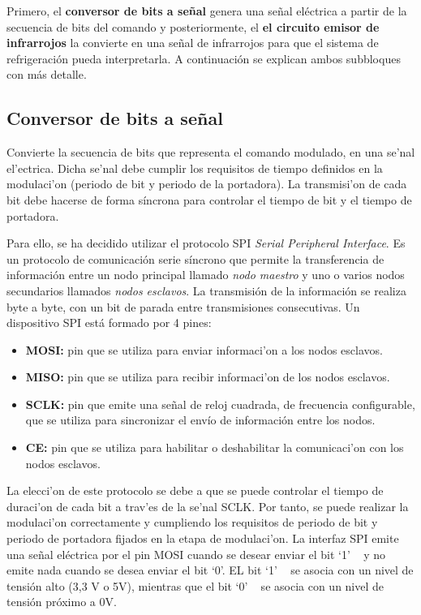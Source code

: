 {	Primero, el \textbf{conversor de bits a señal} genera una señal eléctrica a partir de la secuencia de bits del comando y posteriormente, el \textbf{el circuito emisor de infrarrojos} la convierte en una señal de infrarrojos para que el sistema de refrigeración pueda interpretarla. A continuación se explican ambos subbloques con más detalle.

\subsection{Conversor de bits a señal}\label{subsec:conversor}

	Convierte la secuencia de bits que representa el comando modulado, en una se'nal el'ectrica. Dicha se'nal debe cumplir los requisitos de tiempo definidos en la modulaci'on (periodo de bit y periodo de la portadora). La transmisi'on de cada bit debe hacerse de forma síncrona para controlar el tiempo de bit y el tiempo de portadora. 

	Para ello, se ha decidido utilizar el protocolo SPI \textit{Serial Peripheral Interface}\cite{SPI}. Es un protocolo de comunicación serie síncrono que permite la transferencia de información entre un nodo principal llamado \textit{nodo maestro} y uno o varios nodos secundarios llamados \textit{nodos esclavos}. La transmisión de la información se realiza byte a byte, con un bit de parada entre transmisiones consecutivas. Un dispositivo SPI está formado por 4 pines:

\begin{itemize}
   \item\textbf{MOSI:} pin que se utiliza para enviar informaci'on a los nodos esclavos.
   \item\textbf{MISO:} pin que se utiliza para recibir informaci'on de los nodos esclavos. 
   \item\textbf{SCLK:} pin que emite una señal de reloj cuadrada, de frecuencia configurable, que se utiliza para sincronizar el envío de información entre los nodos.
   \item\textbf{CE:} pin que se utiliza para habilitar o deshabilitar la comunicaci'on con los nodos esclavos.
\end{itemize}

	La elecci'on de este protocolo se debe a que se puede controlar el tiempo de duraci'on de cada bit a trav'es de la se'nal SCLK. Por tanto, se puede realizar la modulaci'on correctamente y cumpliendo los requisitos de periodo de bit y periodo de portadora fijados en la etapa de modulaci'on. La interfaz SPI emite una señal eléctrica por el pin MOSI cuando se desear enviar el bit `1' ~ y no emite nada cuando se desea enviar el bit `0'. EL bit `1' ~ se asocia con un nivel de tensión alto (3,3 V o 5V), mientras que el bit `0' ~  se asocia con un nivel de tensión próximo a 0V.

}
